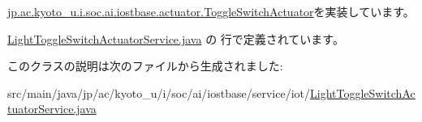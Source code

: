 \hyperlink{interfacejp_1_1ac_1_1kyoto__u_1_1i_1_1soc_1_1ai_1_1iostbase_1_1actuator_1_1_toggle_switch_actuator_acb2ed89477ba7892898d1783ab038e94}{jp.\-ac.\-kyoto\-\_\-u.\-i.\-soc.\-ai.\-iostbase.\-actuator.\-Toggle\-Switch\-Actuator}を実装しています。



 \hyperlink{_light_toggle_switch_actuator_service_8java_source}{Light\-Toggle\-Switch\-Actuator\-Service.\-java} の  行で定義されています。



このクラスの説明は次のファイルから生成されました\-:\begin{DoxyCompactItemize}
\item 
src/main/java/jp/ac/kyoto\-\_\-u/i/soc/ai/iostbase/service/iot/\hyperlink{_light_toggle_switch_actuator_service_8java}{Light\-Toggle\-Switch\-Actuator\-Service.\-java}\end{DoxyCompactItemize}
